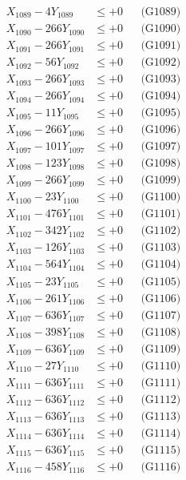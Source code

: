 \documentclass[a4paper,10pt]{article}
\begin{document}
{\begin{align}
X_{1089} - 4Y_{1089} &\leq +0 && \text{(G1089)} \\
X_{1090} - 266Y_{1090} &\leq +0 && \text{(G1090)} \\
\allowbreak
X_{1091} - 266Y_{1091} &\leq +0 && \text{(G1091)} \\
X_{1092} - 56Y_{1092} &\leq +0 && \text{(G1092)} \\
X_{1093} - 266Y_{1093} &\leq +0 && \text{(G1093)} \\
X_{1094} - 266Y_{1094} &\leq +0 && \text{(G1094)} \\
X_{1095} - 11Y_{1095} &\leq +0 && \text{(G1095)} \\
X_{1096} - 266Y_{1096} &\leq +0 && \text{(G1096)} \\
X_{1097} - 101Y_{1097} &\leq +0 && \text{(G1097)} \\
X_{1098} - 123Y_{1098} &\leq +0 && \text{(G1098)} \\
X_{1099} - 266Y_{1099} &\leq +0 && \text{(G1099)} \\
X_{1100} - 23Y_{1100} &\leq +0 && \text{(G1100)} \\
\allowbreak
X_{1101} - 476Y_{1101} &\leq +0 && \text{(G1101)} \\
X_{1102} - 342Y_{1102} &\leq +0 && \text{(G1102)} \\
X_{1103} - 126Y_{1103} &\leq +0 && \text{(G1103)} \\
X_{1104} - 564Y_{1104} &\leq +0 && \text{(G1104)} \\
X_{1105} - 23Y_{1105} &\leq +0 && \text{(G1105)} \\
X_{1106} - 261Y_{1106} &\leq +0 && \text{(G1106)} \\
X_{1107} - 636Y_{1107} &\leq +0 && \text{(G1107)} \\
X_{1108} - 398Y_{1108} &\leq +0 && \text{(G1108)} \\
X_{1109} - 636Y_{1109} &\leq +0 && \text{(G1109)} \\
X_{1110} - 27Y_{1110} &\leq +0 && \text{(G1110)} \\
\allowbreak
X_{1111} - 636Y_{1111} &\leq +0 && \text{(G1111)} \\
X_{1112} - 636Y_{1112} &\leq +0 && \text{(G1112)} \\
X_{1113} - 636Y_{1113} &\leq +0 && \text{(G1113)} \\
X_{1114} - 636Y_{1114} &\leq +0 && \text{(G1114)} \\
X_{1115} - 636Y_{1115} &\leq +0 && \text{(G1115)} \\
X_{1116} - 458Y_{1116} &\leq +0 && \text{(G1116)} \\

\end{align}}
\end{document}
